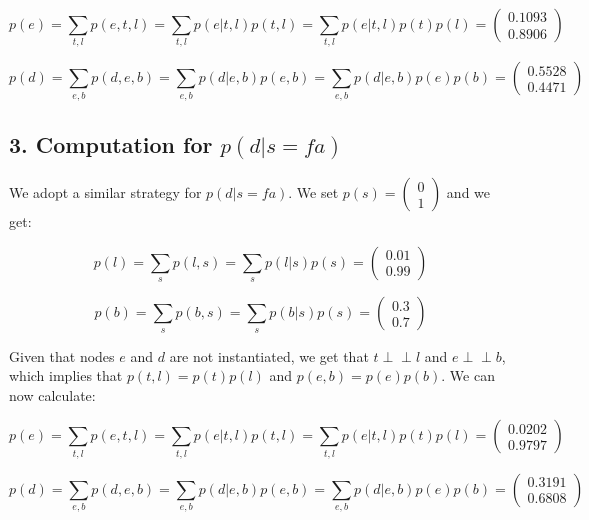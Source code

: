 \documentclass[11pt,a4paper,oneside]{report}
\newcommand\ci{\perp\!\!\!\perp} %
\begin{document}
$$p(e) = \sum_{t,l}p(e,t,l) = \sum_{t,l}p(e|t,l)p(t,l) = 
\sum_{t,l}p(e|t,l)p(t)p(l) = 
\begin{pmatrix}
   0.1093\\
   0.8906
\end{pmatrix}
$$

$$p(d) = \sum_{e,b}p(d,e,b) = \sum_{e,b}p(d|e,b)p(e,b) = 
\sum_{e,b}p(d|e,b)p(e)p(b) = 
\begin{pmatrix}
   0.5528\\
   0.4471
\end{pmatrix}
$$



\subsection*{3. Computation for $p(d|s = fa)$}

We adopt a similar strategy for $p(d| s = fa)$. We set $p(s) = \begin{pmatrix}
                                                              0\\
                                                              1
                                                             \end{pmatrix}$ and 
we get:

$$p(l) = \sum_{s}p(l,s) = \sum_{s}p(l|s)p(s) = 
\begin{pmatrix}
   0.01\\
   0.99
\end{pmatrix}
$$

$$p(b) = \sum_{s}p(b,s) = \sum_{s}p(b|s)p(s) = 
\begin{pmatrix}
   0.3\\
   0.7
\end{pmatrix}
$$

Given that nodes $e$ and $d$ are not instantiated, we get that $t \ci l$ and $e 
\ci b$, which implies that $p(t,l) = p(t)p(l)$ and $p(e,b)=p(e)p(b)$. We can 
now calculate:

$$p(e) = \sum_{t,l}p(e,t,l) = \sum_{t,l}p(e|t,l)p(t,l) = 
\sum_{t,l}p(e|t,l)p(t)p(l) = 
\begin{pmatrix}
   0.0202\\
   0.9797
\end{pmatrix}
$$

$$p(d) = \sum_{e,b}p(d,e,b) = \sum_{e,b}p(d|e,b)p(e,b) = 
\sum_{e,b}p(d|e,b)p(e)p(b) = 
\begin{pmatrix}
   0.3191\\
   0.6808
\end{pmatrix}
$$
\end{document}
